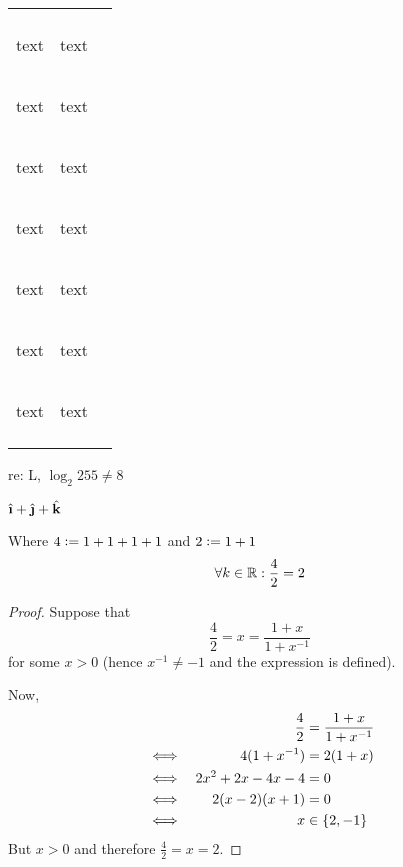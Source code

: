 \begin{longtable}{ccc}
\begin{tabular}{cc}
{\footnotesize text} \\ %
\begin{small}text\end{small} &
{\small text} \\
\begin{normalsize}text\end{normalsize} &
{\normalsize text} \\ %
\begin{large}text\end{large} &
{\large text} \\
\begin{Large}text\end{Large} &
{\Large text} \\
\begin{LARGE}text\end{LARGE} &
{\LARGE text} \\
\begin{huge}text\end{huge} &
{\huge text} \\
\begin{Huge}text\end{Huge} &
{\Huge text} \\
\end{tabular} \\
\end{longtable}

re: L, \(\log_2 255 \ne 8\)

\(\uveci + \uvecj + \uveck\)

\begin{lemma}
Where \(4 \vcentcolon= 1 + 1 + 1 + 1\) and \(2 \vcentcolon= 1 + 1\)
\begin{equation}
\forall k \in \mathbb R: \frac 42 = 2
\end{equation}
\end{lemma}

\begin{proof}
Suppose that
\begin{equation*}
\frac 42 = x = \frac{1 + x}{1 + x^{-1}}
\end{equation*}
for some \(x > 0\) (hence \(x^{-1} \neq -1\) and the expression is defined).

Now,
\begin{alignat*}{2}
&&\frac 42 &= \frac{1 + x}{1 + x^{-1}} \\
&\iff& 4(1 + x^{-1}) &= 2(1 + x) \\
&\iff& 2x^2 + 2x - 4x - 4 &= 0 \\
&\iff& 2(x - 2)(x + 1) &= 0 \\
&\iff& x &\in \{2, -1\} \\
\end{alignat*}
But \(x > 0\) and therefore \(\frac 42 = x = 2\).
\end{proof}

